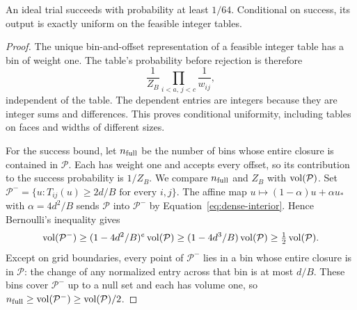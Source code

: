 \begin{proposition}\label{prop:bin-acceptance}
An ideal trial succeeds with probability at least $1/64$.  Conditional on
success, its output is exactly uniform on the feasible integer tables.
\end{proposition}
\begin{proof}
The unique bin-and-offset representation of a feasible integer table
has a bin of weight one.  The table's probability before rejection is
therefore
\begin{equation}\label{eq:dense-equal-table-mass}
 \frac1{Z_B}\prod_{i<a,\,j<c}\frac1{w_{ij}},
\end{equation}
independent of the table.  The dependent entries are integers because
they are integer sums and differences.  This proves conditional
uniformity, including tables on faces and widths of different sizes.

For the success bound, let $n_{\rm full}$ be the number of bins whose
entire closure is contained in $\mathcal P$.  Each has weight one and
accepts every offset, so its contribution to the success probability is
$1/Z_B$.  We compare $n_{\rm full}$ and $Z_B$ with $\operatorname{vol}(\mathcal P)$.
Set
$\mathcal P^- =\{u:T_{ij}(u)\ge2d/B\text{ for every }i,j\}$.
The affine map
$u\mapsto(1-\alpha)u+\alpha u_*$ with $\alpha=4d^2/B$
sends $\mathcal P$ into $\mathcal P^-$ by
Equation~\eqref{eq:dense-interior}.  Hence Bernoulli's inequality gives
\begin{equation}\label{eq:dense-inner-volume}
 \operatorname{vol}(\mathcal P^-)\ge(1-4d^2/B)^e\operatorname{vol}(\mathcal P)
 \ge(1-4d^3/B)\operatorname{vol}(\mathcal P)
 \ge\tfrac12\operatorname{vol}(\mathcal P).
\end{equation}
Except on grid boundaries, every point of $\mathcal P^-$ lies in a bin
whose entire closure is in $\mathcal P$: the change of any normalized
entry across that bin is at most $d/B$.  These bins cover $\mathcal P^-$
up to a null set and each has volume one, so
$n_{\rm full}\ge\operatorname{vol}(\mathcal P^-)\ge\operatorname{vol}(\mathcal P)/2$.


\end{proof}
